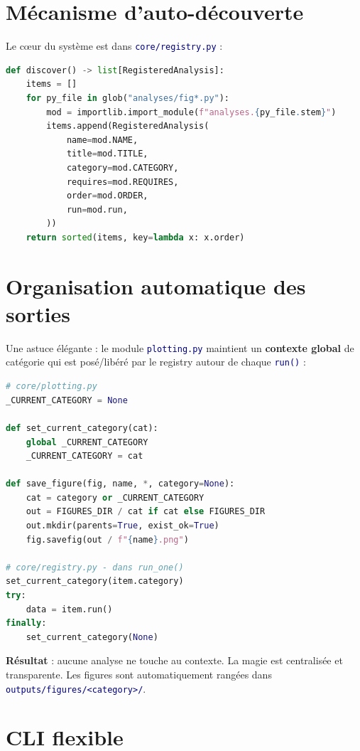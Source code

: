 \documentclass[11pt,a4paper,oneside]{report}
\newcommand{\code}[1]{\texttt{\textcolor{navy}{#1}}}
\begin{document}
\section{Mécanisme d'auto-découverte}

Le cœur du système est dans \code{core/registry.py} :

\begin{lstlisting}[language=Python, caption={Pseudo-code du registry}]
def discover() -> list[RegisteredAnalysis]:
    items = []
    for py_file in glob("analyses/fig*.py"):
        mod = importlib.import_module(f"analyses.{py_file.stem}")
        items.append(RegisteredAnalysis(
            name=mod.NAME,
            title=mod.TITLE,
            category=mod.CATEGORY,
            requires=mod.REQUIRES,
            order=mod.ORDER,
            run=mod.run,
        ))
    return sorted(items, key=lambda x: x.order)
\end{lstlisting}

\section{Organisation automatique des sorties}

Une astuce élégante : le module \code{plotting.py} maintient un \textbf{contexte global} de catégorie qui est posé/libéré par le registry autour de chaque \code{run()} :

\begin{lstlisting}[language=Python, caption={Context manager de catégorie}]
# core/plotting.py
_CURRENT_CATEGORY = None

def set_current_category(cat):
    global _CURRENT_CATEGORY
    _CURRENT_CATEGORY = cat

def save_figure(fig, name, *, category=None):
    cat = category or _CURRENT_CATEGORY
    out = FIGURES_DIR / cat if cat else FIGURES_DIR
    out.mkdir(parents=True, exist_ok=True)
    fig.savefig(out / f"{name}.png")

# core/registry.py - dans run_one()
set_current_category(item.category)
try:
    data = item.run()
finally:
    set_current_category(None)
\end{lstlisting}

\textbf{Résultat} : aucune analyse ne touche au contexte. La magie est centralisée et transparente. Les figures sont automatiquement rangées dans \code{outputs/figures/<category>/}.

\section{CLI flexible}
\end{document}
